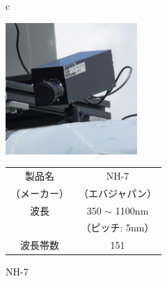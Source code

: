 \begin{figure}[b]
	\begin{center}
		\begin{tabular}{c}



			\begin{minipage}[b]{0.5\linewidth}
			\hspace{1cm}\includegraphics[width=5cm]{./Ch3_SoilTypeDiscrimination/Fig/hyperspectral_camera.jpg}
			\caption{NH-7}\label{fig:hyperspectral_camera}
			\vspace{1.5cm}
			\end{minipage}

			\hfill

			\begin{minipage}[b]{0.5\linewidth}
			\vspace{-2cm} %
			\label{tbl:hyperspectral_camera}
			
				\begin{center}
					\begin{tabular}{|c|c|} \hline
					製品名 & NH-7 \\ 
					（メーカー）& （エバジャパン）\\ \hline
					波長 & 350 $\sim$ 1100nm \\ 
					　　 &（ピッチ: 5nm）\\ \hline
					波長帯数 & 151 \\ \hline
					\end{tabular}
				\end{center}
			\vspace{3cm}
			\end{minipage}

		\end{tabular}
	\end{center}
\end{figure}

